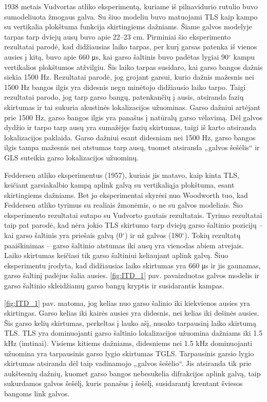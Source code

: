 \documentclass[]{vgtuef}
\begin{document}
1938 metais Vudvortas atliko eksperimentą, kuriame iš pilnavidurio rutulio buvo sumodeliuota žmogaus galva. Su šiuo modeliu buvo matuojami TLS kaip kampo su vertikalia plokštuma funkcija skirtingiems dažniams. Šiame galvos modelyje tarpas tarp dviejų ausų buvo apie 22--23 cm. Pirminiai šio eksperimento rezultatai parodė, kad didžiausias laiko tarpas, per kurį garsas patenka iš vienos ausies į kitą, buvo apie 660 μs, kai garso šaltinis buvo padėtas lygiai 90$^\circ$ kampu vertikalios plokštumos atžvilgiu. Šis laiko tarpas susidaro, kai garso bangos dažnis siekia 1500 Hz. Rezultatai parodė, jog grojant garsui, kurio dažnis mažesnis nei 1500 Hz bangos ilgis yra didesnis negu minėtojo didžiausio laiko tarpo. Taigi rezultatai parodo, jog tarp garso bangų, patenkančių į ausis, atsiranda fazių skirtumas ir tai sukuria akustinės lokalizacijos užuominas. Garso dažniui artėjant prie 1500 Hz, garso bangos ilgis yra panašus į natūralų garso vėlavimą. Dėl galvos dydžio ir tarpo tarp ausų yra sumažėjęs fazių skirtumas, taigi iš karto atsiranda lokalizacijos paklaida. Garso dažniui esant didesniam nei 1500 Hz, garso bangos ilgis tampa mažesnis nei atstumas tarp ausų, tuomet atsiranda „galvos šešėlis“   ir GLS suteikia garso lokalizacijos užuominų.

Feddersen atliko eksperimentus (1957), kuriais jis matavo, kaip kinta TLS, keičiant garsiakalbio kampą aplink galvą su vertikaliąja plokštuma, esant skirtingiems dažniams. Bet jo eksperimentai skyrėsi nuo Woodworth tuo, kad Feddersen atliko tyrimus su realiais žmonėmis, o ne su galvos modeliais. Šio eksperimento rezultatai sutapo su Vudvorto gautais rezultatais. Tyrimo rezultatai taip pat parodė, kad nėra jokio TLS skirtumo tarp dviejų garso šaltinio pozicijų – kai garso šaltinis yra priešais galvą (0$^\circ$) ir už galvos (180$^\circ$). Tokių rezultatų paaiškinimas – garso šaltinio atstumas iki ausų yra vienodas abiem atvejais. Laiko skirtumas keičiasi tik garso šaltiniui keliaujant aplink galvą. Šiuo eksperimentu įrodyta, kad didžiausias laiko skirtumas yra 660 μs ir jis gaunamas, garso šaltinį padėjus šalia ausies. \ref{fig:ITD_1} pav. pavaizduotas galvos modelis ir garso šaltinio skleidžiamų garso bangų kryptis ir susidarantis kampas.

\ref{fig:ITD_1} pav. matoma, jog kelias nuo garso šalinio iki kiekvienos ausies yra skirtingas. Garso kelias iki kairės ausies yra didesnis, nei kelias iki dešinės ausies. Šis garso kelių skirtumas, perkeltas į lauko ašį, nusako tarpausinį laiko skirtumą TLS.
TLS yra dominuojanti garso šaltinio lokalizacijos užuomina dažniams iki 1.5 kHz (imtinai). Visiems kitiems dažniams, didesniems nei 1.5 kHz dominuojanti užuomina yra tarpausinis garso lygio skirtumas TGLS. Tarpausinis garsio lygio skirtumas atsiranda dėl taip vadinamojo „galvos šešėlio“. Jis atsiranda tik prie aukštesnių dažnių, kuomet garso bangos nebesukelia difrakcijos aplink galvą, taip sukurdamos galvos šešėlį, kuris panašus į šešėlį, susidarantį krentant šviesos bangoms link galvos.
\end{document}
